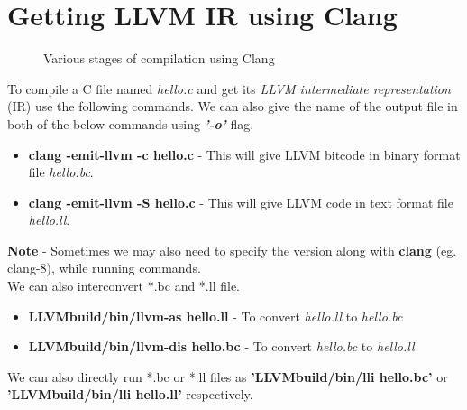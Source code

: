 \section{Getting LLVM IR using Clang}
\begin{figure}[!h]
    \centering
    {
    \setlength{\fboxsep}{8pt}    
    }
    \caption{Various stages of compilation using Clang}
    \label{fig:LLVMcompiler}
\end{figure}

To compile a C file named \textit{hello.c} and get its 
\textit{LLVM intermediate representation} (IR) use the following 
commands. We can also give the name of the output file in both of the 
below commands using \textbf{\textit{'-o'}} flag.
\begin{itemize}
    \item \textbf{clang -emit-llvm -c hello.c} - This will give LLVM 
    bitcode in binary format file \textit{hello.bc}.
    \item \textbf{clang -emit-llvm -S hello.c} - This will give LLVM 
    code in text format file \textit{hello.ll}.
\end{itemize}
\textbf{Note} - Sometimes we may also need to specify the version 
along with \textbf{clang} (eg. clang-8), while running commands.
\\
We can also interconvert *.bc and *.ll file.
\begin{itemize}
    \item \textbf{LLVMbuild/bin/llvm-as hello.ll} - To convert 
    \textit{hello.ll} to \textit{hello.bc}
    \item \textbf{LLVMbuild/bin/llvm-dis hello.bc} - To convert \textit{hello.bc} to \textit{hello.ll}
\end{itemize}
We can also directly run *.bc or *.ll files as 
\textbf{'LLVMbuild/bin/lli hello.bc'} or 
\textbf{'LLVMbuild/bin/lli hello.ll'} respectively.

